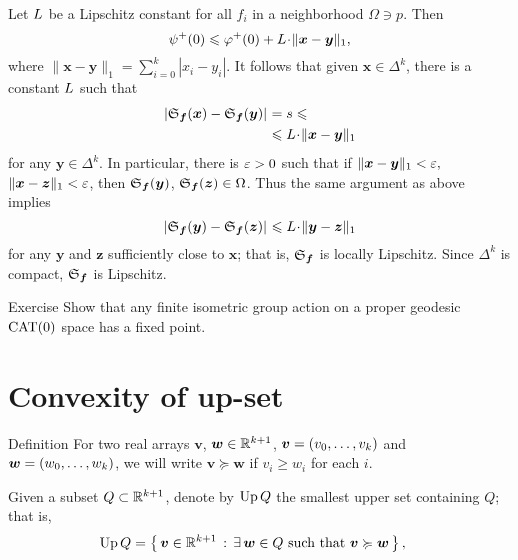 Let $L$ be a Lipschitz constant for all $f_i$ in a neighborhood $\Omega\ni p$.
Then 
\[\psi^+(0)
\le 
\phi^+(0)+\Lip\cdot\|\bm{x}-\bm{y}\|_1,\] 
where $\|\bm{x}-\bm{y}\|_1=\sum_{i=0}^k|x_i-y_i|$.
It follows that given $\bm{x}\in\Delta^k$, there is a constant $L$ such that
\begin{align*}
\dist{\spx{\bm{f}}(\bm{x})}{\spx{\bm{f}}(\bm{y})}{}
&=
s
\le
\\
&\le 
\Lip\cdot\|\bm{x}-\bm{y}\|_1
\end{align*}
for any $\bm{y}\in\Delta^k$.
In particular, there is $\varepsilon>0$ such that if $\|\bm{x}-\bm{y}\|_1<\varepsilon,$ $\|\bm{x}-\bm{z}\|_1 <\varepsilon$, then $\mathfrak{S}_{\bm{f}}(\bm{y})$, $\mathfrak{S}_{\bm{f}}(\bm{z})\in\Omega$. 
Thus the same argument as above implies 
\[\dist{\spx{\bm{f}}(\bm{y})}{\spx{\bm{f}}(\bm{z})}{}
\le \Lip\cdot\|\bm{y}-\bm{z}\|_1\]
for any $\bm{y}$ and $\bm{z}$ sufficiently close to $\bm{x}$; that is, $\mathfrak{S}_{\bm{f}}$ is locally Lipschitz.
Since $\Delta^k$ is compact, $\mathfrak{S}_{\bm{f}}$ is Lipschitz.
\qeds

\begin{thm}{Exercise}\label{ex:finite-action-CAT}
Show that any finite isometric group action on a proper geodesic $\mathrm{CAT}(0)$ space has
a fixed point.
\end{thm}

\section{Convexity of up-set}

\begin{thm}{Definition}\label{def:ordung}
For two real arrays $\bm{v}$, $\bm{w}\in \mathbb{R}^{k+1}$,
$\bm{v}=(v_0,\z\dots,v_\kay)$ 
and 
$\bm{w}=(w_0,\z\dots,w_\kay)$, 
we will write
$\bm{v}\succcurlyeq\bm{w}$ if $v_i\ge w_i$ for each $i$.
\end{thm}

Given a subset $Q\subset \mathbb{R}^{k+1}$, 
denote by $\mathop{\rm Up}\nolimits Q$ \label{PAGE.def:Up}
the smallest upper set containing $Q$;
that is,
\begin{align*}
\Up Q 
&=
\set{\bm{v}\in\RR^{\kay+1}}{\exists\, \bm{w}\in Q\ \text{such that}\ \bm{v}\succcurlyeq\bm{w}},
\end{align*}

